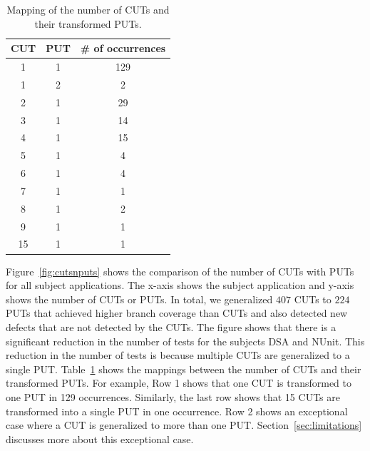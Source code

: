 \begin{table}[t]
\begin{CodeOut}
\begin{center}
\centering 
\begin {tabular} {|c|c|c|}
\hline \textbf{CUT} & \textbf{PUT} & \textbf{\# of occurrences}\\
\hline
\hline 1   & 1   & 129\\
\hline 1   & 2   & 2\\
\hline 2   & 1   & 29\\
\hline 3   & 1   & 14\\
\hline 4   & 1   & 15\\
\hline 5   & 1   & 4\\
\hline 6   & 1   & 4\\
\hline 7   & 1   & 1\\
\hline 8   & 1   & 2\\
\hline 9   & 1   & 1\\
\hline 15   & 1   & 1\\
\hline
\end{tabular}\vspace*{-2ex}
\caption {\label{tab:cutputmapping} Mapping of the number of CUTs and their transformed PUTs.} \vspace*{-6ex}
\end{center}
\end{CodeOut}
\end{table}

Figure~\ref{fig:cutsnputs} shows the comparison of the number of CUTs with PUTs for all subject applications. The x-axis shows the subject application and y-axis shows the number of CUTs or PUTs. In total, we generalized $407$ CUTs to $224$ PUTs that achieved higher branch coverage than CUTs and also detected new defects that are not detected by the CUTs. The figure shows that there is a significant reduction in the number of tests for the subjects DSA and NUnit. This reduction in the number of tests is because multiple CUTs are generalized to a single PUT. Table~\ref{tab:cutputmapping} shows the mappings between the number of CUTs and their transformed PUTs. For example, Row 1 shows that one CUT is transformed to one PUT in 129 occurrences. Similarly, the last row shows that 15 CUTs are transformed into a single PUT in one occurrence. Row 2 shows an exceptional case where a CUT is generalized to more than one PUT. Section~\ref{sec:limitations} discusses more about this exceptional case. 

